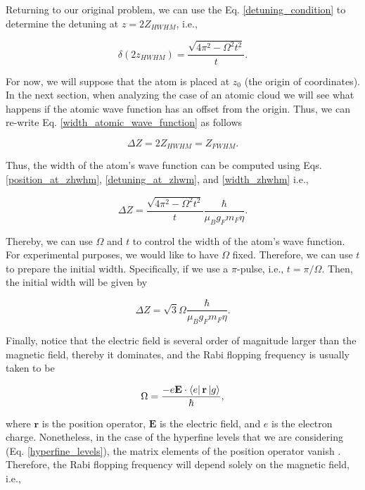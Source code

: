 \documentclass{article}
\begin{document}
Returning to our original problem, we can use the Eq. \ref{detuning_condition} to determine the detuning at $z=2Z_{HWHM}$, i.e.,

\begin{equation}\label{detuning_at_zhwm}
\delta (2z_{HWHM}) = \frac{\sqrt{4 \pi^{2} - \Omega^{2} t^{2}}}{t}.
\end{equation}

For now, we will suppose that the atom is placed at $z_{0}$ (the origin of coordinates). In the next section, when analyzing the case of an atomic cloud we will see what happens if the atomic wave function has an offset from the origin. Thus, we can re-write Eq. \ref{width_atomic_wave_function} as follows

\begin{equation}\label{width_zhwhm}
  \Delta Z = 2Z_{HWHM} = Z_{FWHM}.
\end{equation}

Thus, the width of the atom's wave function can be computed using Eqs.  \ref{position_at_zhwhm}, \ref{detuning_at_zhwm}, and \ref{width_zhwhm} i.e.,

\begin{equation}
\Delta Z = \frac{\sqrt{4 \pi^{2} - \Omega^{2} t^{2}}}{t} \frac{\hbar}{\mu_{B} g_{F} m_{F} \eta}.
\end{equation}

Thereby, we can use $\Omega$ and $t$ to control the width of the atom's wave function. For experimental purposes, we would like to have $\Omega$ fixed. Therefore, we can use $t$ to prepare the initial width. Specifically, if we use a $\pi$-pulse, i.e., $t=\pi/\Omega$. Then, the initial width will be given by

\begin{equation}\label{initial_width}
\Delta Z = \sqrt{3} \Omega \frac{\hbar}{\mu_{B} g_{F} m_{F} \eta}.
\end{equation}

Finally, notice that the electric field is several order of magnitude larger than the magnetic field, thereby it dominates, and the Rabi flopping frequency is usually taken to be

\begin{equation*}
\Omega = \frac{- e \textbf{E} \cdot \bra{e} \textbf{r} \ket{g}}{\hbar},
\end{equation*}

where $\textbf{r}$ is the position operator, $\textbf{E}$ is the electric field, and $e$ is the electron charge. Nonetheless, in the case of the hyperfine levels that we are considering (Eq. \ref{hyperfine_levels}), the matrix elements of the position operator vanish  \cite{Steck2010}. Therefore, the Rabi flopping frequency will depend solely on the magnetic field, i.e.,
\end{document}
